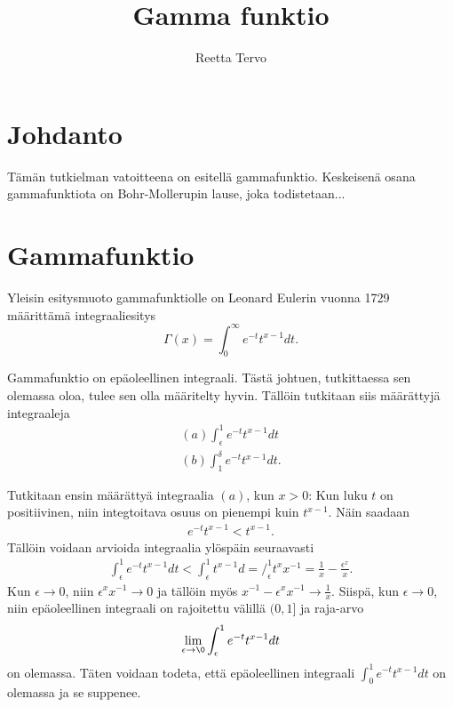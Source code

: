 \documentclass[12pt]{article}
\title{Gamma funktio}
\author{Reetta Tervo}
\theoremstyle{definition}
\theoremstyle{plain}
\numberwithin{equation}{section}
\begin{document}
\maketitle

\newpage
\tableofcontents

\newpage
\section{Johdanto}
\onehalfspacing
Tämän tutkielman vatoitteena on esitellä gammafunktio. Keskeisenä osana gammafunktiota on Bohr-Mollerupin lause, joka todistetaan...

\newpage





\section{Gammafunktio}
Yleisin esitysmuoto gammafunktiolle on Leonard Eulerin vuonna 1729 määrittämä integraaliesitys
\begin{equation}\label{yhtalo:gammafunktio}
     \Gamma(x) = \int_{0}^{\infty} e^{-t} t^{x-1} dt.
\end{equation}

Gammafunktio on epäoleellinen integraali. Tästä johtuen, tutkittaessa sen olemassa oloa, tulee sen olla määritelty hyvin. Tällöin tutkitaan siis määrättyjä integraaleja
\begin{align*}
    (a) \int_{\epsilon}^{1} e^{-t} t^{x-1} dt \\
    (b) \int_{1}^{\delta} e^{-t} t^{x-1} dt.
\end{align*}

Tutkitaan ensin määrättyä integraalia $(a)$, kun $x>0$:\newline
Kun luku $t$ on positiivinen, niin integtoitava osuus on pienempi kuin $t^{x-1}$. Näin saadaan
\begin{align*}
    e^{-t} t^{x-1} < t^{x-1}.
\end{align*} 
Tällöin voidaan arvioida integraalia ylöspäin seuraavasti 
\begin{align*}
    \int_{\epsilon}^{1} e^{-t} t^{x-1} dt < \int_{\epsilon}^{1} t^{x-1} d = \Big/_\epsilon^1 {t^x}x^{-1} = \frac{1}{x}-\frac{\epsilon^{x}}{x}.
\end{align*}
Kun $\epsilon \rightarrow 0$, niin $\epsilon^{x}x^{-1}\rightarrow 0$ ja tällöin myös $x^{-1}-\epsilon{^x}x^{-1} \rightarrow \frac{1}{x}$. Siispä, kun $\epsilon\rightarrow0$, niin epäoleellinen integraali on  rajoitettu välillä $(0, 1]$ ja raja-arvo
\begin{align*}
    \lim_{\epsilon\to\0}\int_\epsilon^{1}e^{-t}t^{x-1}dt
\end{align*}
on olemassa. Täten voidaan todeta, että epäoleellinen integraali $\int_{0}^{1} e^{-t} t^{x-1} dt$ on olemassa ja se suppenee. \newline
\end{document}
